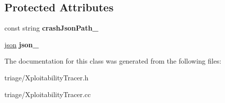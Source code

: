 \subsection*{Protected Attributes}
\begin{DoxyCompactItemize}
\item 
\mbox{\label{classsl2_1_1_xploitability_tracer_ad510ee48f6d0c138c1091accb6c436ed}} 
const string {\bfseries crash\+Json\+Path\+\_\+}
\item 
\mbox{\label{classsl2_1_1_xploitability_tracer_a15aadbd76570b357ee8a1d2731bc695a}} 
\mbox{\hyperlink{classnlohmann_1_1basic__json}{json}} {\bfseries json\+\_\+}
\end{DoxyCompactItemize}


The documentation for this class was generated from the following files\+:\begin{DoxyCompactItemize}
\item 
triage/Xploitability\+Tracer.\+h\item 
triage/Xploitability\+Tracer.\+cc\end{DoxyCompactItemize}

